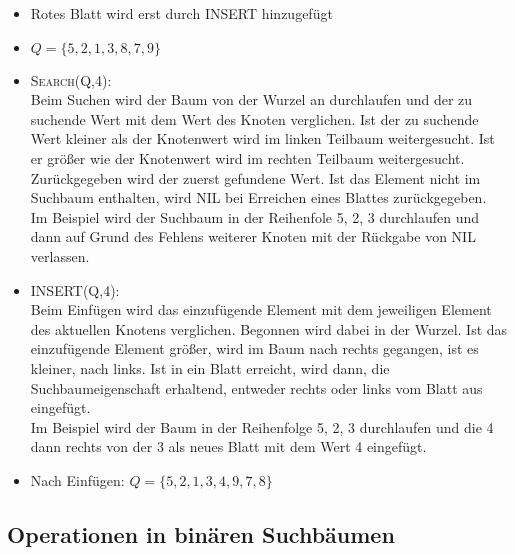 \documentclass[ngerman,draft,parskip=half*,twoside]{scrreprt}
\theoremstyle{break}
\theoremstyle{nonumberbreak}
\begin{document}
  \begin{itemize}
   \item Rotes Blatt wird erst durch INSERT hinzugefügt
   \item $Q = \{ 5, 2, 1, 3, 8, 7, 9 \}$
   \item \textsc{Search}(Q,4): \\
      Beim Suchen wird der Baum von der Wurzel an durchlaufen und der zu 
      suchende Wert mit dem Wert des Knoten verglichen. Ist der zu suchende 
      Wert kleiner als der Knotenwert wird im linken Teilbaum weitergesucht. 
      Ist er größer wie der Knotenwert wird im rechten Teilbaum 
      weitergesucht. Zurückgegeben wird der zuerst gefundene Wert. Ist das 
      Element nicht im Suchbaum enthalten, wird NIL bei Erreichen eines 
      Blattes zurückgegeben.\\
      Im Beispiel wird der Suchbaum in der Reihenfole 5, 2, 3 durchlaufen 
      und dann auf Grund des Fehlens weiterer Knoten mit der Rückgabe von 
      NIL verlassen.
   \item INSERT(Q,4): \\
      Beim Einfügen wird das einzufügende Element mit dem jeweiligen 
      Element des aktuellen Knotens verglichen. Begonnen wird dabei in der 
      Wurzel. Ist das einzufügende Element größer, wird im Baum nach 
      rechts gegangen, ist es kleiner, nach links. Ist in ein 
      Blatt erreicht, wird dann, die Suchbaumeigenschaft erhaltend, entweder rechts oder 
      links vom Blatt aus eingefügt.\\
      Im Beispiel wird der Baum in der Reihenfolge 5, 2, 3 
      durchlaufen und die 4 dann rechts von der 3 als neues Blatt mit dem Wert 4
      eingefügt.
   \item Nach Einfügen: $Q = \{ 5, 2, 1, 3, 4, 9, 7, 8 \}$
  \end{itemize}

  \subsection{Operationen in binären Suchbäumen}
\end{document}
